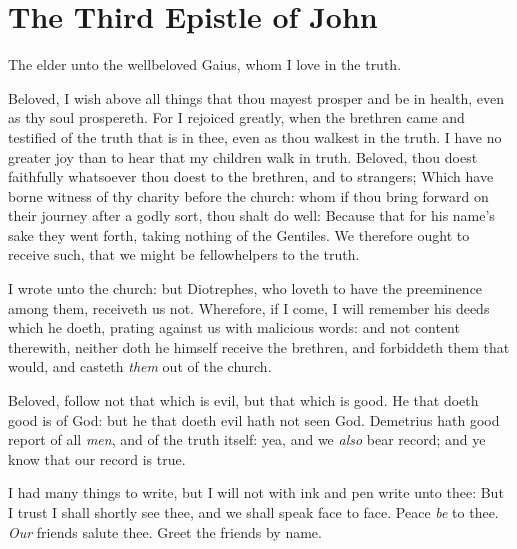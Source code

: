 \documentclass[11pt,letterpaper,oneside]{memoir}
\begin{document}
\chapter[3 John]{The Third Epistle of John}

The elder unto the wellbeloved Gaius, whom I love in the truth.

Beloved, I wish above all things that thou mayest prosper and be in
health, even as thy soul prospereth.  For I rejoiced greatly, when the
brethren came and testified of the truth that is in thee, even as thou
walkest in the truth.  I have no greater joy than to hear that my
children walk in truth.  Beloved, thou doest faithfully whatsoever
thou doest to the brethren, and to strangers;  Which have borne
witness of thy charity before the church: whom if thou bring forward
on their journey after a godly sort, thou shalt do well:  Because that
for his name's sake they went forth, taking nothing of the Gentiles.
We therefore ought to receive such, that we might be fellowhelpers to
the truth.

I wrote unto the church: but Diotrephes, who loveth to have the
preeminence among them, receiveth us not.  Wherefore, if I come, I
will remember his deeds which he doeth, prating against us with
malicious words: and not content therewith, neither doth he himself
receive the brethren, and forbiddeth them that would, and casteth
\emph{them} out of the church.

Beloved, follow not that which is evil, but that which is good. He
that doeth good is of God: but he that doeth evil hath not seen God.
Demetrius hath good report of all \emph{men}, and of the truth itself:
yea, and we \emph{also} bear record; and ye know that our record is
true.

I had many things to write, but I will not with ink and pen write
unto thee:  But I trust I shall shortly see thee, and we shall speak
face to face. Peace \emph{be} to thee. \emph{Our} friends salute thee.
Greet the friends by name.
\end{document}
